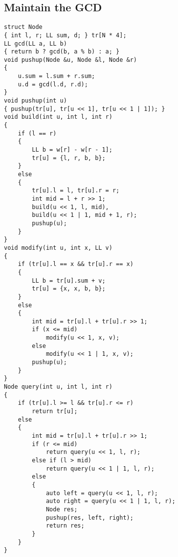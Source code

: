 \subsection{Maintain the GCD}
\begin{lstlisting}
struct Node
{ int l, r; LL sum, d; } tr[N * 4];
LL gcd(LL a, LL b)
{ return b ? gcd(b, a % b) : a; }
void pushup(Node &u, Node &l, Node &r)
{
    u.sum = l.sum + r.sum;
    u.d = gcd(l.d, r.d);
}
void pushup(int u)
{ pushup(tr[u], tr[u << 1], tr[u << 1 | 1]); }
void build(int u, int l, int r)
{
    if (l == r)
    {
        LL b = w[r] - w[r - 1];
        tr[u] = {l, r, b, b};
    }
    else
    {
        tr[u].l = l, tr[u].r = r;
        int mid = l + r >> 1;
        build(u << 1, l, mid),
        build(u << 1 | 1, mid + 1, r);
        pushup(u);
    }
}
void modify(int u, int x, LL v)
{
    if (tr[u].l == x && tr[u].r == x)
    {
        LL b = tr[u].sum + v;
        tr[u] = {x, x, b, b};
    }
    else
    {
        int mid = tr[u].l + tr[u].r >> 1;
        if (x <= mid)
            modify(u << 1, x, v);
        else
            modify(u << 1 | 1, x, v);
        pushup(u);
    }
}
Node query(int u, int l, int r)
{
    if (tr[u].l >= l && tr[u].r <= r)
        return tr[u];
    else
    {
        int mid = tr[u].l + tr[u].r >> 1;
        if (r <= mid)
            return query(u << 1, l, r);
        else if (l > mid)
            return query(u << 1 | 1, l, r);
        else
        {
            auto left = query(u << 1, l, r);
            auto right = query(u << 1 | 1, l, r);
            Node res;
            pushup(res, left, right);
            return res;
        }
    }
}
\end{lstlisting}

